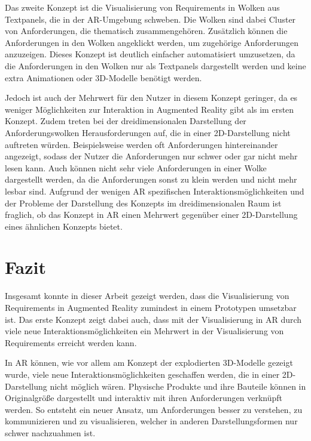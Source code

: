Das zweite Konzept ist die Visualisierung von Requirements in Wolken aus Textpanels, die in der AR-Umgebung schweben.
Die Wolken sind dabei Cluster von Anforderungen, die thematisch zusammengehören.
Zusätzlich können die Anforderungen in den Wolken angeklickt werden, um zugehörige Anforderungen anzuzeigen.
Dieses Konzept ist deutlich einfacher automatisiert umzusetzen, da die Anforderungen in den Wolken nur als Textpanels dargestellt werden und keine extra Animationen oder 3D-Modelle benötigt werden.

Jedoch ist auch der Mehrwert für den Nutzer in diesem Konzept geringer, da es weniger Möglichkeiten zur Interaktion in Augmented Reality gibt als im ersten Konzept.
Zudem treten bei der dreidimensionalen Darstellung der Anforderungswolken Herausforderungen auf, die in einer 2D-Darstellung nicht auftreten würden.
Beispielsweise werden oft Anforderungen hintereinander angezeigt, sodass der Nutzer die Anforderungen nur schwer oder gar nicht mehr lesen kann.
Auch können nicht sehr viele Anforderungen in einer Wolke dargestellt werden, da die Anforderungen sonst zu klein werden und nicht mehr lesbar sind.
Aufgrund der wenigen AR spezifischen Interaktionsmöglichkeiten und der Probleme der Darstellung des Konzepts im dreidimensionalen Raum ist fraglich, ob das Konzept in AR einen Mehrwert gegenüber einer 2D-Darstellung eines ähnlichen Konzepts bietet.



\section{Fazit}

Insgesamt konnte in dieser Arbeit gezeigt werden, dass die Visualisierung von Requirements in Augmented Reality zumindest in einem Prototypen umsetzbar ist.
Das erste Konzept zeigt dabei auch, dass mit der Visualisierung in AR durch viele neue Interaktionsmöglichkeiten ein Mehrwert in der Visualisierung von Requirements erreicht werden kann.

In AR können, wie vor allem am Konzept der explodierten 3D-Modelle gezeigt wurde, viele neue Interaktionsmöglichkeiten geschaffen werden, die in einer 2D-Darstellung nicht möglich wären.
Physische Produkte und ihre Bauteile können in Originalgröße dargestellt und interaktiv mit ihren Anforderungen verknüpft werden.
So entsteht ein neuer Ansatz, um Anforderungen besser zu verstehen, zu kommunizieren und zu visualisieren, welcher in anderen Darstellungsformen nur schwer nachzuahmen ist.

